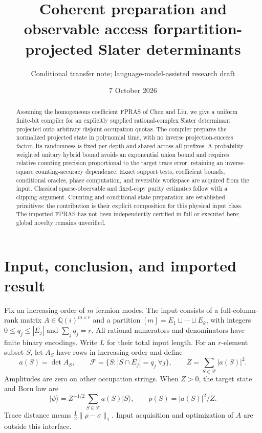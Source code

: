 \documentclass[11pt]{article}
\title{Coherent preparation and observable access for\newline partition-projected Slater determinants}
\author{Conditional transfer note; language-model-assisted research draft}
\date{7 October 2026}
\theoremstyle{remark}
\newcommand{\Q}{\mathbb Q}
\newcommand{\ket}[1]{\lvert #1\rangle}
\begin{document}
\maketitle
\begin{abstract}
Assuming the homogeneous coefficient FPRAS of Chen and Liu, we give a uniform finite-bit compiler for an explicitly supplied rational-complex Slater determinant projected onto arbitrary disjoint occupation quotas. The compiler prepares the normalized projected state in polynomial time, with no inverse projection-success factor. Its randomness is fixed per depth and shared across all prefixes. A probability-weighted unitary hybrid bound avoids an exponential union bound and requires relative counting precision proportional to the target trace error, retaining an inverse-square counting-accuracy dependence. Exact support tests, coefficient bounds, conditional oracles, phase computation, and reversible workspace are acquired from the input. Classical sparse-observable and fixed-copy purity estimates follow with a clipping argument. Counting and conditional state preparation are established primitives: the contribution is their explicit composition for this physical input class. The imported FPRAS has not been independently certified in full or executed here; global novelty remains unverified.
\end{abstract}

\section{Input, conclusion, and imported result}
Fix an increasing order of $m$ fermion modes. The input consists of a full-column-rank matrix $A\in\Q(i)^{m\times r}$ and a partition $[m]=E_1\sqcup\cdots\sqcup E_k$, with integers $0\le q_j\le |E_j|$ and $\sum_jq_j=r$. All rational numerators and denominators have finite binary encodings. Write $L$ for their total input length. For an $r$-element subset $S$, let $A_S$ have rows in increasing order and define
\[
 a(S)=\det A_S,\qquad
 \mathcal F=\{S:|S\cap E_j|=q_j\ \forall j\},\qquad
 Z=\sum_{S\in\mathcal F}|a(S)|^2.
\]
Amplitudes are zero on other occupation strings. When $Z>0$, the target state and Born law are
\begin{equation}\label{eq:target}
 \ket\psi=Z^{-1/2}\sum_{S\in\mathcal F}a(S)\ket S,
 \qquad p(S)=|a(S)|^2/Z.
\end{equation}
Trace distance means $\frac12\|\rho-\sigma\|_1$. Input acquisition and optimization of $A$ are outside this interface.
\end{document}
